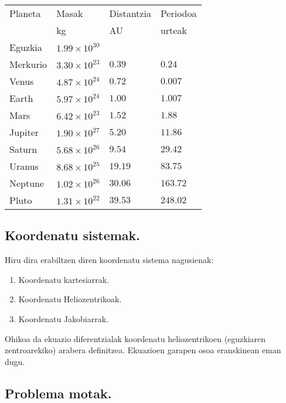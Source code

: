 \begin{table} [h!]
\caption{}
\label{tab:1}       %
\begin{tabular}{l l l l} 
\hline
 Planeta   &  Masak                 & Distantzia   & Periodoa    \\   
           &  kg                    & AU           &   urteak      \\ \hline
 Eguzkia   &  $1.99 \times 10^{30}$ &              &              \\         
 Merkurio  &  $3.30 \times 10^{23}$ & $0.39$       &  $0.24$     \\
 Venus     &  $4.87 \times 10^{24}$ & $0.72$       &  $0.007$    \\
 Earth     &  $5.97 \times 10^{24}$ & $1.00$       &  $1.007$    \\
 Mars      &  $6.42 \times 10^{23}$ & $1.52$       &  $1.88$     \\ \hline
 Jupiter   &  $1.90 \times 10^{27}$ & $5.20$       &  $11.86$    \\
 Saturn    &  $5.68 \times 10^{26}$ & $9.54$       &  $29.42$    \\
 Uranus    &  $8.68 \times 10^{25}$ & $19.19$      &  $83.75$    \\
 Neptune   &  $1.02 \times 10^{26}$ & $30.06$      &  $163.72$    \\
 Pluto     &  $1.31 \times 10^{22}$ & $39.53$      &  $248.02$    \\
\hline
\end{tabular}
\end{table}

\subsection{Koordenatu sistemak.}
\label{ss:341}

Hiru dira erabiltzen diren koordenatu sistema nagusienak:

\begin{enumerate}
\item Koordenatu kartesiarrak.
\item Koordenatu Heliozentrikoak.
\item Koordenatu Jakobiarrak.
\end{enumerate}

Ohikoa da ekuazio diferentzialak koordenatu heliozentrikoen (eguzkiaren zentroarekiko) arabera definitzea. 
Ekuazioen garapen osoa eranskinean eman dugu.


\subsection{Problema motak.}
\label{ss:342}

